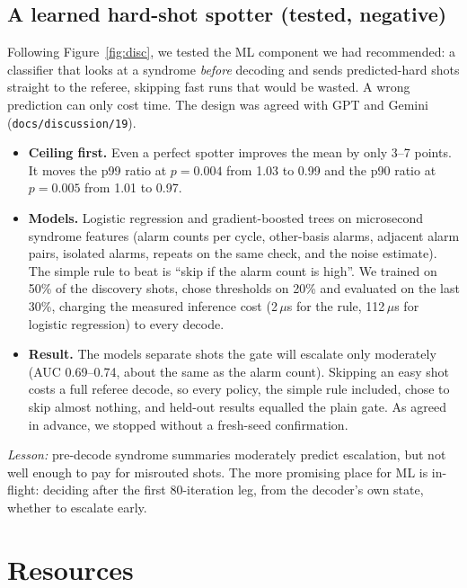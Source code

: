 \documentclass[11pt]{article}
\begin{document}
\subsection{A learned hard-shot spotter (tested, negative)}\label{sec:hardshot}
Following Figure~\ref{fig:disc}, we tested the ML component we had recommended: a classifier that looks at a syndrome
\emph{before} decoding and sends predicted-hard shots straight to the referee, skipping fast runs that would be wasted.
A wrong prediction can only cost time. The design was agreed with GPT and Gemini (\texttt{docs/discussion/19}).
\begin{itemize}
  \item \textbf{Ceiling first.} Even a perfect spotter improves the mean by only 3--7 points. It moves the p99 ratio at $p=0.004$ from
        1.03 to 0.99 and the p90 ratio at $p=0.005$ from 1.01 to 0.97.
  \item \textbf{Models.} Logistic regression and gradient-boosted trees on microsecond syndrome features (alarm counts per cycle,
        other-basis alarms, adjacent alarm pairs, isolated alarms, repeats on the same check, and the noise estimate). The simple rule to beat is
        ``skip if the alarm count is high''. We trained on 50\% of the discovery shots, chose thresholds on 20\% and evaluated on the last 30\%,
        charging the measured inference cost (2\,$\mu$s for the rule, 112\,$\mu$s for logistic regression) to every decode.
  \item \textbf{Result.} The models separate shots the gate will escalate only moderately (AUC 0.69--0.74, about the same as the
        alarm count). Skipping an easy shot costs a full referee decode, so every policy, the simple rule included, chose to skip
        almost nothing, and held-out results equalled the plain gate. As agreed in advance, we stopped without a fresh-seed confirmation.
\end{itemize}
\emph{Lesson:} pre-decode syndrome summaries moderately predict escalation, but not well enough to pay for misrouted shots.
The more promising place for ML is in-flight: deciding after the first 80-iteration leg, from the decoder's own state,
whether to escalate early.

\section{Resources}\label{sec:resources}
\end{document}
